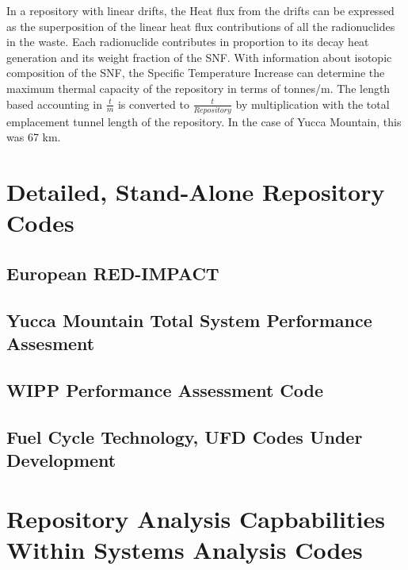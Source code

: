 In a repository with linear drifts, the Heat flux from the drifts can 
be expressed as the superposition of the linear heat flux 
contributions of all the radionuclides in the waste. Each radionuclide 
contributes in proportion to its decay heat generation and its weight 
fraction of the SNF. With information about isotopic composition of 
the SNF, the Specific Temperature Increase can determine the maximum 
thermal capacity of the repository in terms of tonnes/m. The length 
based accounting in $\frac{t}{m}$ is converted to 
$\frac{t}{Repository}$ by multiplication with the total emplacement 
tunnel length of the repository.  In the case of Yucca Mountain, this 
was 67 km.



\section{Detailed, Stand-Alone Repository 
Codes}\label{sec:detailed_codes}

\subsection{European RED-IMPACT}

\subsection{Yucca Mountain Total System Performance Assesment}

\subsection{WIPP Performance Assessment Code}

\subsection{Fuel Cycle Technology, UFD Codes Under Development}


\section{Repository Analysis Capbabilities Within Systems Analysis 
Codes}\label{sec:SA_repos}

